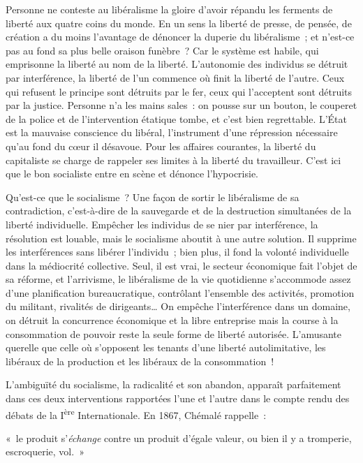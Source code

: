 \documentclass[french,twoside]{book} %
\newenvironment{quoteblock}%
  {\begin{quoting}}
  {\end{quoting}}
\newenvironment{quotebar}{%
    \def\FrameCommand{{\color{rubric!10!}\vrule width 0.5em} \hspace{0.9em}}%
    \def\OuterFrameSep{\itemsep} %
    \MakeFramed {\advance\hsize-\width \FrameRestore}
  }%
  {%
    \endMakeFramed
  }
\renewenvironment{quoteblock}%
  {%
    \savenotes
    \setstretch{0.9}
    \normalfont
    \begin{quotebar}
  }
  {%
    \end{quotebar}
    \spewnotes
  }
\begin{document}
\noindent Personne ne conteste au libéralisme la gloire d’avoir répandu les ferments de liberté aux quatre coins du monde. En un sens la liberté de presse, de pensée, de création a du moins l’avantage de dénoncer la duperie du libéralisme ; et n’est-ce pas au fond sa plus belle oraison funèbre ? Car le système est habile, qui emprisonne la liberté au nom de la liberté. L’autonomie des individus se détruit par interférence, la liberté de l’un commence où finit la liberté de l’autre. Ceux qui refusent le principe sont détruits par le fer, ceux qui l’acceptent sont détruits par la justice. Personne n’a les mains sales : on pousse sur un bouton, le couperet de la police et de l’intervention étatique tombe, et c’est bien regrettable. L’État est la mauvaise conscience du libéral, l’instrument d’une répression nécessaire qu’au fond du cœur il désavoue. Pour les affaires courantes, la liberté du capitaliste se charge de rappeler ses limites à la liberté du travailleur. C’est ici que le bon socialiste entre en scène et dénonce l’hypocrisie.\par
Qu’est-ce que le socialisme ? Une façon de sortir le libéralisme de sa contradiction, c’est-à-dire de la sauvegarde et de la destruction simultanées de la liberté individuelle. Empêcher les individus de se nier par interférence, la résolution est louable, mais le socialisme aboutit à une autre solution. Il supprime les interférences sans libérer l’individu ; bien plus, il fond la volonté individuelle dans la médiocrité collective. Seul, il est vrai, le secteur économique fait l’objet de sa réforme, et l’arrivisme, le libéralisme de la vie quotidienne s’accommode assez d’une planification bureaucratique, contrôlant l’ensemble des activités, promotion du militant, rivalités de dirigeants… On empêche l’interférence dans un domaine, on détruit la concurrence économique et la libre entreprise mais la course à la consommation de pouvoir reste la seule forme de liberté autorisée. L’amusante querelle que celle où s’opposent les tenants d’une liberté autolimitative, les libéraux de la production et les libéraux de la consommation !\par
L’ambiguïté du socialisme, la radicalité et son abandon, apparaît parfaitement dans ces deux interventions rapportées l’une et l’autre dans le compte rendu des débats de la I\textsuperscript{ère} Internationale. En 1867, Chémalé rappelle :\par

\begin{quoteblock}
\noindent « le produit s’\emph{échange} contre un produit d’égale valeur, ou bien il y a tromperie, escroquerie, vol. »\end{quoteblock}
\end{document}
